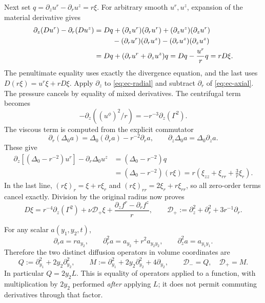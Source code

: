Next set \(q=\partial_z u^r-\partial_r u^z=r\xi\).
For arbitrary smooth \(u^r,u^z\), expansion of the material derivative
gives
\begin{align*}
 \partial_z(Du^r)-\partial_r(Du^z)
 &=Dq+(\partial_zu^r)(\partial_ru^r)
       +(\partial_zu^z)(\partial_zu^r)\\
 &\hspace{9mm}-(\partial_ru^r)(\partial_ru^z)
       -(\partial_ru^z)(\partial_zu^z)\\
 &=Dq+(\partial_ru^r+\partial_zu^z)q
 =Dq-\frac{u^r}{r}q=rD\xi.
\end{align*}
The penultimate equality uses exactly the divergence equation, and the
last uses \(D(r\xi)=u^r\xi+rD\xi\).
Apply \(\partial_z\) to \eqref{eq:ec-radial} and subtract
\(\partial_r\) of \eqref{eq:ec-axial}.  The pressure cancels by equality
of mixed derivatives.  The centrifugal term becomes
\[
 -\partial_z((u^\phi)^2/r)=-r^{-3}\partial_z(\Gamma^2).
\]
The viscous term is computed from the explicit commutator
\[
 \partial_r(\Delta_0 a)=\Delta_0(\partial_ra)-r^{-2}\partial_ra,
 \qquad \partial_z\Delta_0a=\Delta_0\partial_za.
\]
These give
\begin{align*}
 \partial_z[(\Delta_0-r^{-2})u^r]-\partial_r\Delta_0u^z
  &=(\Delta_0-r^{-2})q\\
  &=(\Delta_0-r^{-2})(r\xi)
   =r\left(\xi_{zz}+\xi_{rr}+\frac3r\xi_r\right).
\end{align*}
In the last line, \((r\xi)_r=\xi+r\xi_r\) and
\((r\xi)_{rr}=2\xi_r+r\xi_{rr}\), so all zero-order terms cancel
exactly.  Division by the original radius now proves
\begin{equation}
 D\xi=r^{-4}\partial_z(\Gamma^2)
       +\nu\mathcal D_+\xi
       +\frac{\partial_zf^r-\partial_rf^z}{r},
 \qquad \mathcal D_+:=\partial_z^2+\partial_r^2+3r^{-1}\partial_r.
 \label{eq:ec-xi-physical}
\end{equation}

For any scalar \(a(y_1,y_2,t)\),
\[
 \partial_r a=r a_{y_2},\qquad
 \partial_r^2 a=a_{y_2}+r^2a_{y_2y_2},\qquad
 \partial_z^2a=a_{y_1y_1}.
\]
Therefore the two distinct diffusion operators in volume coordinates are
\begin{equation}
 Q:=\partial_{y_1}^2+2y_2\partial_{y_2}^2,
 \qquad M:=\partial_{y_1}^2+2y_2\partial_{y_2}^2+4\partial_{y_2},
 \qquad \mathcal D_-=Q,\quad\mathcal D_+=M.
 \label{eq:ec-volume-diffusion}
\end{equation}
In particular \(Q=2y_2L\).  This is equality of operators applied to a
function, with multiplication by \(2y_2\) performed \emph{after} applying
\(L\); it does not permit commuting derivatives through that factor.

